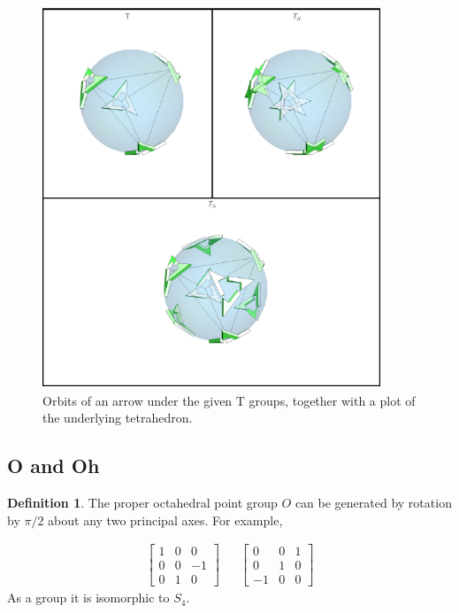 \documentclass[12pt, letterpaper]{article}
\theoremstyle{definition} %
\newtheorem{defn}[thm]{Definition} %
\begin{document}
\begin{figure}[H]
\centering
\includegraphics[width=0.9\textwidth]{figureT}
\caption{Orbits of an arrow under the given T groups, together with a plot of the underlying tetrahedron.}

\label{figure-t}
\end{figure}

\subsection{O and Oh}

\begin{defn}
  The proper octahedral point group $O$ can be generated by rotation by $\pi/2$ about any two principal axes. For example, 

  \begin{align*}
    \begin{bmatrix}
       1 & 0 & 0 \\ 0 & 0 & -1 \\ 0 & 1 & 0
    \end{bmatrix} & &  
    \begin{bmatrix}
      0 & 0 & 1 \\ 0 & 1 & 0 \\ -1 & 0 & 0
    \end{bmatrix} 
  \end{align*}
  As a group it is isomorphic to $S_4$.
\end{defn}
\end{document}
